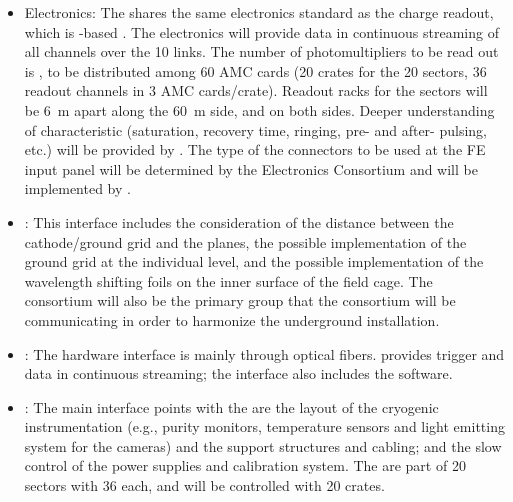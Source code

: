 
\begin{itemize}

\item {} Electronics: The  shares the same  electronics standard as the charge readout, which is -based \cite{utca}. The  electronics will provide data in continuous streaming %
of all  channels over the \SI{10}{\Gbps} links. The number of photomultipliers to be read out is \dpnumpmtch, to be distributed among \num{60} AMC cards (\num{20}  crates for the \num{20}  sectors, \num{36} readout channels in \num{3} AMC cards/crate). Readout racks for the sectors will be \SI{6}{\m} apart along the \SI{60}{\m} side, and on both sides. Deeper understanding of  characteristic (saturation, recovery time, ringing, pre- and after- pulsing, etc.) will be provided by  . The type of the connectors to be used at the FE input panel will be determined by the  Electronics Consortium and will be implemented by  .

\item {}: This interface includes the consideration of the distance between the cathode/ground grid and the  planes, the possible implementation of the ground grid at the individual  level, and the possible implementation of the wavelength shifting foils on the inner surface of the field cage. The  consortium will also be the primary group that the  consortium will be communicating in order to harmonize the underground installation.

\item {}: The hardware interface is mainly through optical fibers.   provides trigger and data in continuous streaming;  the interface also includes the  software.

\item {}: The main interface points with the  are the layout of the cryogenic instrumentation (e.g., purity monitors, temperature sensors and light emitting system for the cameras) and the  support structures and cabling; and the slow control of the  power supplies and calibration system. The   are part of \num{20} sectors with \num{36}  each, and will be controlled with \num{20}  crates.


\end{itemize}
